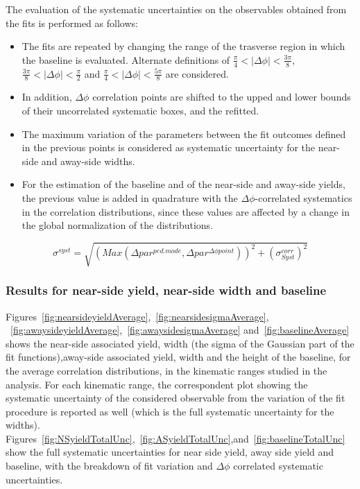 The evaluation of the systematic uncertainties on the observables obtained from the fits is performed as follows:

\begin{itemize}
\item The fits are repeated by changing the range of the trasverse region in which the baseline is evaluated. Alternate definitions of $\frac{\pi}{4}<|\Delta\phi|<\frac{3\pi}{8}$, $\frac{3\pi}{8}<|\Delta\phi|<\frac{\pi}{2}$ and $\frac{\pi}{4}<|\Delta\phi|<\frac{5\pi}{8}$ are considered.
\item In addition, $\Delta\phi$ correlation points are shifted to the upped and lower bounds of their uncorrelated systematic boxes, and the refitted.
\item The maximum variation of the parameters between the fit outcomes defined in the previous points is considered as systematic uncertainty for the near-side and away-side widths.
\item For the estimation of the baseline and of the near-side and away-side yields, the previous value is added in quadrature with the $\Delta\phi$-correlated systematics in the correlation distributions, since these values are affected by a change in the global normalization of the distributions.
\end{itemize}

\begin{equation}
\sigma^{syst} = \sqrt{\left(Max\left(\Delta par^{ped.mode},\Delta par^{\Delta\phi point}\right)\right)^{2} + (\sigma_{Syst}^{corr})^{2}}
\end{equation}

\subsubsection{Results for near-side yield, near-side width and baseline}

Figures~\ref{fig:nearsideyieldAverage},~\ref{fig:nearsidesigmaAverage}, ~\ref{fig:awaysideyieldAverage},~\ref{fig:awaysidesigmaAverage} and~\ref{fig:baselineAverage} shows the near-side associated yield, width (the sigma of the Gaussian part of the fit functions),away-side associated yield, width and the height of the baseline, for the average correlation distributions, in the kinematic ranges studied in the analysis. For each kinematic range, the correspondent plot showing the systematic uncertainty of the considered observable from the variation of the fit procedure is reported as well (which is the full systematic uncertainty for the widths).
Figures~\ref{fig:NSyieldTotalUnc},~\ref{fig:ASyieldTotalUnc},and~\ref{fig:baselineTotalUnc} show the full systematic uncertainties for near side yield, away side yield and baseline, with the breakdown of fit variation and $\Delta\phi$ correlated systematic uncertainties.


